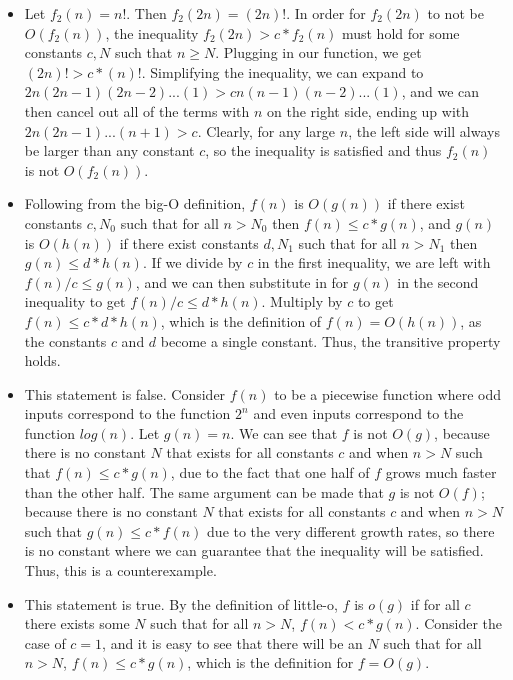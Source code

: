 \documentclass[11pt]{article}
\begin{document}
\begin{enumerate}
\begin{itemize}
\item
Let $f_2(n) = n!$. Then $f_2(2n) = (2n)!$. In order for $f_2(2n)$ to not be $O(f_2(n))$, the inequality $f_2(2n) > c *f_2(n)$ must hold for some constants $c, N$ such that $n \geq N$. Plugging in our function, we get $(2n)! > c*(n)!$. Simplifying the inequality, we can expand to $2n(2n-1)(2n-2)...(1) > cn(n-1)(n-2)...(1)$, and we can then cancel out all of the terms with $n$ on the right side, ending up with $2n(2n-1)...(n+1) > c$. Clearly, for any large $n$, the left side will always be larger than any constant $c$, so the inequality is satisfied and thus $f_2(n)$ is not $O(f_2(n))$. 

\item
Following from the big-O definition, $f(n)$ is $O(g(n))$ if there exist constants $c, N_0$ such that for all $n > N_0$ then $f(n) \leq c*g(n)$, and $g(n)$ is $O(h(n))$ if there exist constants $d, N_1$ such that for all $n > N_1$ then $g(n) \leq d*h(n)$. If we divide by $c$ in the first inequality, we are left with $f(n)/c \leq g(n)$, and we can then substitute in for $g(n)$ in the second inequality to get $f(n)/c \leq d*h(n)$. Multiply by $c$ to get $f(n) \leq c*d*h(n)$, which is the definition of $f(n) = O(h(n))$, as the constants $c$ and $d$ become a single constant. Thus, the transitive property holds.

\item
This statement is false. Consider $f(n)$ to be a piecewise function where odd inputs correspond to the function $2^n$ and even inputs correspond to the function $log(n)$. Let $g(n) = n$. We can see that $f$ is not $O(g)$, because there is no constant $N$ that exists for all constants $c$ and when $n > N$ such that $f(n) \leq c * g(n)$, due to the fact that one half of $f$ grows much faster than the other half. The same argument can be made that $g$ is not $O(f)$; because there is no constant $N$ that exists for all constants $c$ and when $n > N$ such that $g(n) \leq c * f(n)$ due to the very different growth rates, so there is no constant where we can guarantee that the inequality will be satisfied. Thus, this is a counterexample. 

\item
This statement is true. By the definition of little-o, $f$ is $o(g)$ if for all $c$ there exists some $N$ such that for all $n > N$, $f(n) < c * g(n)$. Consider the case of $c = 1$, and it is easy to see that there will be an $N$ such that for all $n > N$, $f(n) \leq c * g(n)$, which is the definition for $f = O(g)$. 


\end{itemize}
\end{enumerate}
\end{document}
